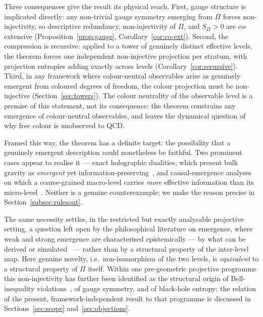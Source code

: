 \documentclass[12pt,a4paper]{article}
\begin{document}
  Three consequences give the result its physical reach.
  First, gauge structure is implicated directly: any non-trivial gauge symmetry emerging from $\Pi$ forces
  non-injectivity, so descriptive redundancy, non-injectivity of $\Pi$, and $S_\Pi > 0$ are co-extensive
  (Proposition~\ref{prop:gauge}, Corollary~\ref{cor:co-ext}).
  Second, the compression is recursive: applied to a tower of genuinely distinct effective levels, the theorem
  forces one independent non-injective projection per stratum, with projection entropies adding exactly across
  levels (Corollary~\ref{cor:recursive}).
  Third, in any framework where colour-neutral observables arise as genuinely emergent from coloured degrees
  of freedom, the colour projection must be non-injective (Section~\ref{sec:towers}).
  The colour neutrality of the observable level is a premise of this statement, not its consequence: the
  theorem constrains any emergence of colour-neutral observables, and leaves the dynamical question of why
  free colour is unobserved to QCD.

  Framed this way, the theorem has a definite target: the possibility that a genuinely emergent description
  could nonetheless be faithful.
  Two prominent cases appear to realise it --- exact holographic dualities, which present bulk gravity as
  \emph{emergent} yet information-preserving~\citep{deHaro2016}, and causal-emergence analyses on which a
  coarse-grained macro-level carries \emph{more} effective information than its
  micro-level~\citep{Hoel2013,Dewhurst2021}.
  Neither is a genuine counterexample; we make the reason precise in Section~\ref{subsec:rulesout}.

  The same necessity settles, in the restricted but exactly analysable projective setting, a question left open
  by the philosophical literature on emergence, where weak and strong emergence are characterised
  epistemically --- by what can be derived or simulated~\citep{Bedau1997,Chalmers2006,Kim1999} --- rather than
  by a structural property of the inter-level map.
  Here genuine novelty, i.e.\ non-isomorphism of the two levels, is \emph{equivalent} to a structural property
  of $\Pi$ itself.
  Within one pre-geometric projective programme this non-injectivity has further been identified as the
  structural origin of Bell-inequality violations~\citep{Beau2026b}, of gauge symmetry, and of black-hole
  entropy; the relation of the present, framework-independent result to that programme is discussed in
  Sections~\ref{sec:scope} and~\ref{sec:objections}.
\end{document}
